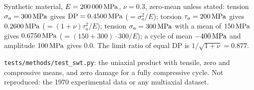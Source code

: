  Synthetic material, $E=200\,000\,\mathrm{MPa}$, $\nu=0.3$, zero-mean unless stated:
tension $\sigma_a=300\,\mathrm{MPa}$ gives $\mathrm{DP}=0.4500\,\mathrm{MPa}$ ($=\sigma_a^2/E$); torsion
$\tau_a=200\,\mathrm{MPa}$ gives $0.2600\,\mathrm{MPa}$ ($=(1+\nu)\tau_a^2/E$); tension $\sigma_a=300\,\mathrm{MPa}$ with a mean of
$150\,\mathrm{MPa}$ gives $0.6750\,\mathrm{MPa}$ ($=(150+300)\cdot300/E$); a cycle of mean $-400\,\mathrm{MPa}$ and amplitude
$100\,\mathrm{MPa}$ gives $0.0$. The limit ratio of equal DP is $1/\sqrt{1+\nu}=0.877$.

 \texttt{tests/methods/test\_swt.py}: the uniaxial product with tensile, zero
and compressive means, and zero damage for a fully compressive cycle. Not reproduced: the 1970
experimental data or any multiaxial dataset.
